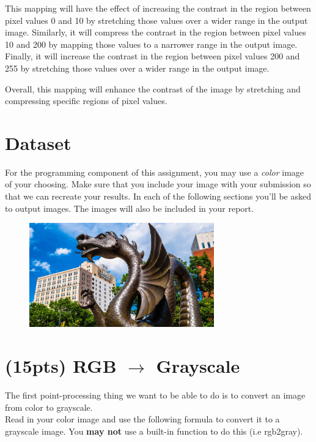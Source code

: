 \documentclass[12pt]{article}
\begin{document}
\begin{enumerate}
\begin{enumerate}
This mapping will have the effect of increasing the contrast in the region between pixel values 0 and 10 by stretching those values over a wider range in the output image. Similarly, it will compress the contrast in the region between pixel values 10 and 200 by mapping those values to a narrower range in the output image. Finally, it will increase the contrast in the region between pixel values 200 and 255 by stretching those values over a wider range in the output image.

Overall, this mapping will enhance the contrast of the image by stretching and compressing specific regions of pixel values.


\end{enumerate}
\end{enumerate}


\newpage
\section{Dataset}
For the programming component of this assignment, you may use a \emph{color} image of your choosing.  Make sure that you include your image with your submission so that we can recreate your results.  In each of the following sections you'll be asked to output images.  The images will also be included in your report.

\begin{figure}[htp]
    \centering
    \includegraphics[width=8cm]{input_1.jpg}
\end{figure}

\section{(15pts) RGB $\rightarrow$ Grayscale}
\noindent
The first point-processing thing we want to be able to do is to convert an image from color to grayscale.\\

\noindent
Read in your color image and use the following formula to convert it to a grayscale image.  You \textbf{may not} use a built-in function to do this (i.e rgb2gray).\\
\end{document}
